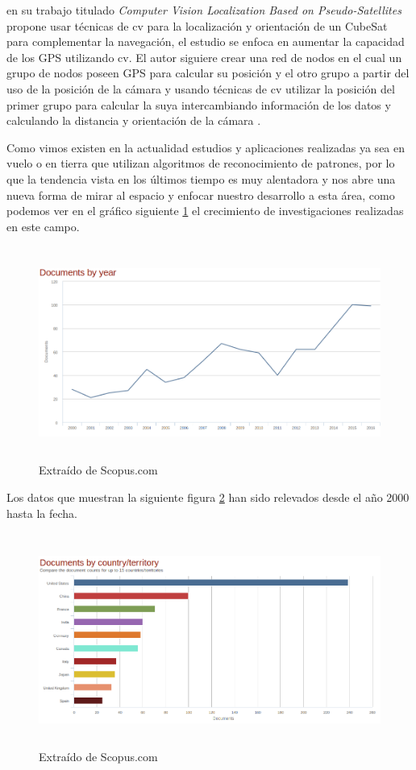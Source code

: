 \cite{Huggins} en su trabajo titulado \textit{Computer Vision Localization Based on Pseudo-Satellites} propone usar técnicas de \ac{cv} para la localización y orientación de un CubeSat para complementar la navegación, el estudio se enfoca en  aumentar la capacidad de los GPS utilizando \ac{cv}. El autor siguiere crear una red de nodos en el cual un grupo de nodos poseen GPS para calcular su posición y el otro grupo a partir del uso de la posición de la cámara y usando técnicas de  \ac{cv}  utilizar la posición del primer grupo para calcular la suya intercambiando información de los datos y calculando la distancia y orientación de la cámara \citep{Huggins}.

Como vimos existen en la actualidad estudios y aplicaciones realizadas ya sea en vuelo o en tierra que utilizan algoritmos de reconocimiento de patrones, por lo que la tendencia vista en los últimos tiempo es muy alentadora y nos abre una nueva forma de mirar al espacio y enfocar nuestro desarrollo a esta área, como podemos ver en el gráfico siguiente \ref{Fig: scopus1} el crecimiento de investigaciones realizadas en este campo. 

\begin{figure}[h]
 \centering
  \includegraphics[height=7cm,keepaspectratio=true,clip=true]{imagenes/Logos/scopus.png}
  \caption{Extraído de Scopus.com}
	\label{Fig: scopus1}
\end{figure}
Los datos que muestran la siguiente figura \ref{Fig: scopus2} han sido relevados desde el año 2000 hasta la fecha.

\begin{figure}[h]
 \centering
  \includegraphics[height=7cm,keepaspectratio=true,clip=true]{imagenes/Logos/scopus2.png}
  \caption{Extraído de Scopus.com}
	\label{Fig: scopus2}
\end{figure}


